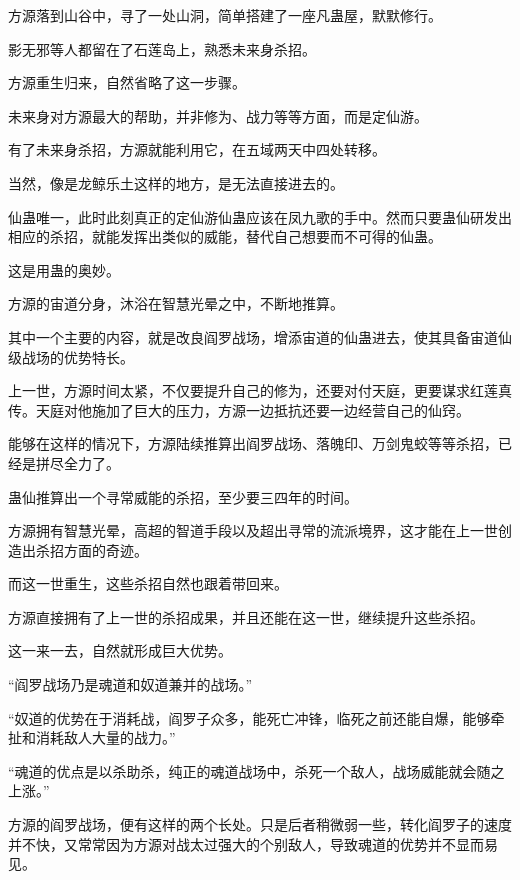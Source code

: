 
\begin{this_body}

方源落到山谷中，寻了一处山洞，简单搭建了一座凡蛊屋，默默修行。

影无邪等人都留在了石莲岛上，熟悉未来身杀招。

方源重生归来，自然省略了这一步骤。

未来身对方源最大的帮助，并非修为、战力等等方面，而是定仙游。

有了未来身杀招，方源就能利用它，在五域两天中四处转移。

当然，像是龙鲸乐土这样的地方，是无法直接进去的。

仙蛊唯一，此时此刻真正的定仙游仙蛊应该在凤九歌的手中。然而只要蛊仙研发出相应的杀招，就能发挥出类似的威能，替代自己想要而不可得的仙蛊。

这是用蛊的奥妙。

方源的宙道分身，沐浴在智慧光晕之中，不断地推算。

其中一个主要的内容，就是改良阎罗战场，增添宙道的仙蛊进去，使其具备宙道仙级战场的优势特长。

上一世，方源时间太紧，不仅要提升自己的修为，还要对付天庭，更要谋求红莲真传。天庭对他施加了巨大的压力，方源一边抵抗还要一边经营自己的仙窍。

能够在这样的情况下，方源陆续推算出阎罗战场、落魄印、万剑鬼蛟等等杀招，已经是拼尽全力了。

蛊仙推算出一个寻常威能的杀招，至少要三四年的时间。

方源拥有智慧光晕，高超的智道手段以及超出寻常的流派境界，这才能在上一世创造出杀招方面的奇迹。

而这一世重生，这些杀招自然也跟着带回来。

方源直接拥有了上一世的杀招成果，并且还能在这一世，继续提升这些杀招。

这一来一去，自然就形成巨大优势。

“阎罗战场乃是魂道和奴道兼并的战场。”

“奴道的优势在于消耗战，阎罗子众多，能死亡冲锋，临死之前还能自爆，能够牵扯和消耗敌人大量的战力。”

“魂道的优点是以杀助杀，纯正的魂道战场中，杀死一个敌人，战场威能就会随之上涨。”

方源的阎罗战场，便有这样的两个长处。只是后者稍微弱一些，转化阎罗子的速度并不快，又常常因为方源对战太过强大的个别敌人，导致魂道的优势并不显而易见。


\end{this_body}
